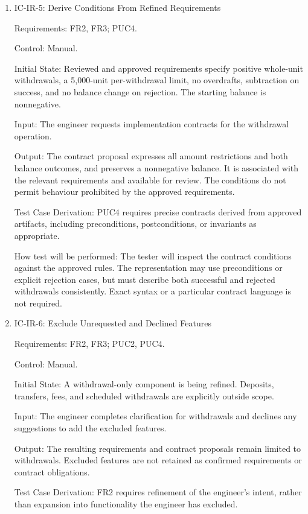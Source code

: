 \documentclass[12pt, titlepage]{article}
\begin{document}
\begin{enumerate}
\item{IC-IR-5: Derive Conditions From Refined Requirements\\}

Requirements: FR2, FR3; PUC4.

Control: Manual.

Initial State: Reviewed and approved requirements specify positive whole-unit
withdrawals, a 5,000-unit per-withdrawal limit, no overdrafts, subtraction on
success, and no balance change on rejection. The starting balance is
nonnegative.

Input: The engineer requests implementation contracts for the withdrawal
operation.

Output: The contract proposal expresses all amount restrictions and both
balance outcomes, and preserves a nonnegative balance. It is associated with
the relevant requirements and available for review. The conditions do not
permit behaviour prohibited by the approved requirements.

Test Case Derivation: PUC4 requires precise contracts derived from approved
artifacts, including preconditions, postconditions, or invariants as
appropriate.

How test will be performed: The tester will inspect the contract conditions
against the approved rules. The representation may use preconditions or
explicit rejection cases, but must describe both successful and rejected
withdrawals consistently. Exact syntax or a particular contract language is
not required.

\item{IC-IR-6: Exclude Unrequested and Declined Features\\}

Requirements: FR2, FR3; PUC2, PUC4.

Control: Manual.

Initial State: A withdrawal-only component is being refined. Deposits,
transfers, fees, and scheduled withdrawals are explicitly outside scope.

Input: The engineer completes clarification for withdrawals and declines any
suggestions to add the excluded features.

Output: The resulting requirements and contract proposals remain limited to
withdrawals. Excluded features are not retained as confirmed requirements or
contract obligations.

Test Case Derivation: FR2 requires refinement of the engineer's intent, rather
than expansion into functionality the engineer has excluded.


\end{enumerate}
\end{document}
